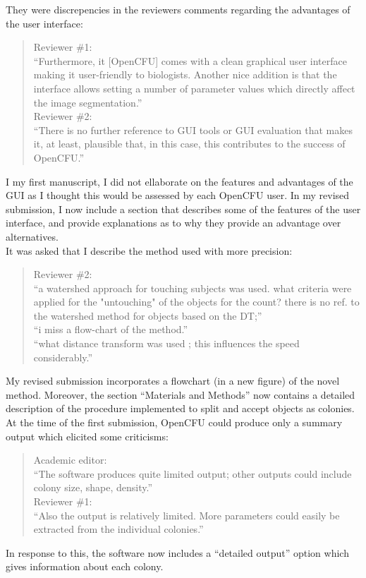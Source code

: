 \documentclass{letter}
\begin{document}
\begin{letter}{}
They were discrepencies in the reviewers comments regarding the advantages of the user interface:
  \begin{quote}
  Reviewer \#1:\\
	  ``Furthermore, it [OpenCFU] comes with a clean graphical user interface making it user-friendly to biologists.
	   Another nice addition is that the interface allows setting a number of parameter values which directly affect the image segmentation.''\\
   Reviewer \#2:\\
		``There is no further reference to GUI tools or GUI evaluation that makes it, at least, plausible that, 
		in this case, this contributes to the success of OpenCFU.''
	\end{quote}
I my first manuscript, I did not ellaborate on the features and advantages of the GUI as 
I thought this would be assessed by each OpenCFU user. 
In my revised submission, I now include a section that describes some of the features of the user interface,
 and provide explanations as to why they provide an advantage over alternatives.\\
 
 It was asked that I describe the method used with more precision:
 \begin{quote}
	 Reviewer \#2:\\
	 ``a watershed approach for touching subjects was used. 
	what criteria were applied for the "untouching" of the objects for the count?
	there is no ref. to the watershed method for objects based on the DT;''\\
	``i miss a flow-chart of the method.''\\
	``what distance transform was used ; this influences the speed considerably.''
 \end{quote}
 My revised submission incorporates a flowchart (in a new figure) of the novel method.
 Moreover, the section ``Materials and Methods'' now contains a detailed description of the procedure implemented to split and accept objects as colonies.\\

At the time of the first submission, OpenCFU could produce only a summary output which elicited some criticisms:
  \begin{quote}
  Academic editor:\\
   ``The software produces quite limited output; other outputs could include colony size, shape, density.''\\
   Reviewer \#1:\\
   ``Also the output is relatively limited. More parameters could easily be extracted from the individual colonies.''\\
	\end{quote}
 In response to this, the software now includes a ``detailed output'' option which gives information about each colony.\\


\end{letter}
\end{document}
